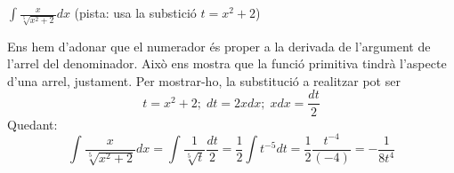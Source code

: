 \Exercise[title=Substitució] $\int \frac{x}{\sqrt[5]{x^2+2}}dx$ (pista: usa la substició $t=x^2+2$)


\Answer

  Ens hem d'adonar que el numerador és proper a la derivada de l'argument de l'arrel del denominador. Això ens mostra que la funció primitiva tindrà l'aspecte d'una arrel, justament. Per mostrar-ho, la substitució a realitzar pot ser
  \[
    t=x^2+2 ; \; dt=2xdx; \; xdx=\frac{dt}{2}
  \]
  Quedant:
  \[
    \int \frac{x}{\sqrt[5]{x^2+2}}dx = \int \frac{1}{\sqrt[5]{t}}\frac{dt}{2} = \frac{1}{2} \int t^{-5} dt = \frac{1}{2} \frac{t^{-4}}{(-4)} = -\frac{1}{8t^4}
  \]

